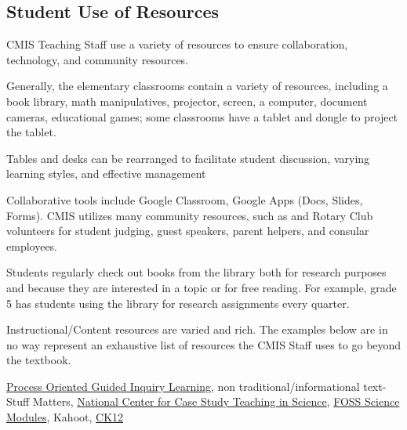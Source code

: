 \subsection{Student Use of Resources}



\begin{findings}
CMIS Teaching Staff use a variety of resources to ensure collaboration, technology, and community resources. 

Generally, the elementary classrooms contain a variety of resources, including a book library, math manipulatives, projector, screen, a computer, document cameras, educational games; some classrooms have a tablet and dongle to project the tablet. 

Tables and desks can be rearranged to facilitate student discussion, varying learning styles, and effective management

Collaborative tools include Google Classroom, Google Apps (Docs, Slides, Forms). CMIS utilizes many community resources, such as and Rotary Club volunteers for student judging, guest speakers, parent helpers, and consular employees. 

Students regularly check out books from the library both for research purposes and  because they are interested in a topic or for free reading.  For example, grade 5 has students using the library for research assignments every quarter. 

Instructional/Content resources are varied and rich. The examples below are in no way represent an exhaustive list of resources the CMIS Staff uses to go beyond the textbook. 
 

\href{https://pogil.org/}{Process Oriented Guided Inquiry Learning}, non traditional/informational text- Stuff Matters, \href{http://sciencecases.lib.buffalo.edu/cs/}{National Center for Case Study Teaching in Science}, \href{https://docs.google.com/a/cmis.ac.th/document/d/16TR92UNODi6qAM_vZkqFmqV_NGde5JCabfIoimXw8EM/edit?usp=sharing}{FOSS Science Modules}, Kahoot, \href{http://www.ck12.org/}{CK12}


\end{findings}
